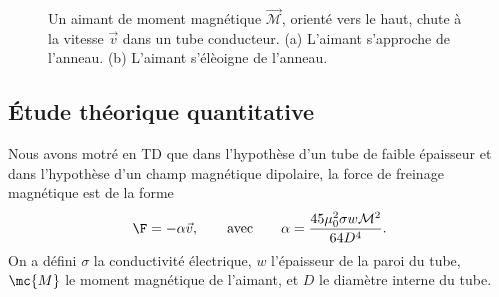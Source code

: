 \begin{figure}[t!]
\centering
\caption{Un aimant de moment magnétique $\vec{\mathcal{M}}$, orienté vers le haut, chute à la vitesse $\vec{v}$ dans un tube conducteur. (a) L'aimant s'approche de l'anneau. (b) L'aimant s'élèoigne de l'anneau.}
\label{fig:chute}
\end{figure}

%

\subsection{Étude théorique quantitative}

Nous avons motré en TD que dans l'hypothèse d'un tube de faible épaisseur et dans l'hypothèse d'un champ magnétique dipolaire, la force de freinage magnétique est de la forme
$$
\F = -\alpha \Vec{v},  \qquad \text{avec} \qquad \alpha = \dfrac{45 \mu_{0}^{2}\sigma w \mathcal{M}^{2}}{64 D^{4}}.
$$
On a défini $\sigma$ la conductivité électrique, $w$ l'épaisseur de la paroi du tube, $\mc{M}$ le moment magnétique de l'aimant, et $D$ le diamètre interne du tube.
%

